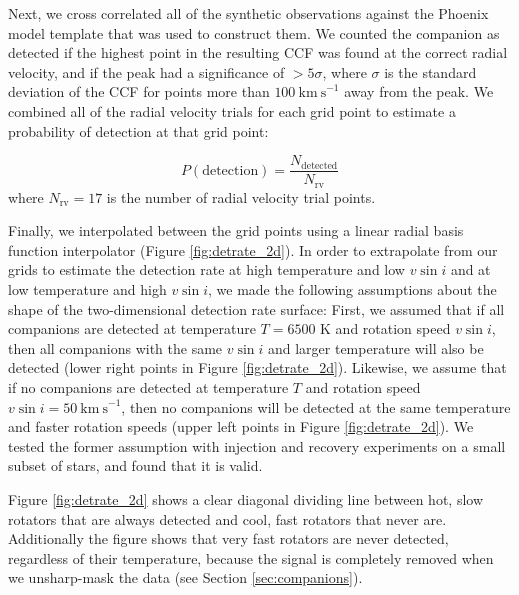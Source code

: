 \documentclass{emulateapj}
\begin{document}
Next, we cross correlated all of the synthetic observations against the Phoenix model template that was used to construct them. We counted the companion as detected if the highest point in the resulting CCF was found at the correct radial velocity, and if the peak had a significance of $>5\sigma$, where $\sigma$ is the standard deviation of the CCF for points more than $100\ \mathrm{km\ s}^{-1}$ away from the peak. We combined all of the radial velocity trials for each grid point to estimate a probability of detection at that grid point:

\begin{equation}
P(\mathrm{detection}) = \frac{N_\mathrm{detected}}{N_\mathrm{rv}}
\end{equation}
where $N_\mathrm{rv} = 17$ is the number of radial velocity trial points. 

Finally, we interpolated between the grid points using a linear radial basis function interpolator (Figure \ref{fig:detrate_2d}). In order to extrapolate from our grids to estimate the detection rate at high temperature and low $v\sin{i}$ and at low temperature and high $v\sin{i}$, we made the following assumptions about the shape of the two-dimensional detection rate surface: First, we assumed that if all companions are detected at temperature $T=6500$ K and rotation speed $v\sin{i}$, then all companions with the same $v\sin{i}$ and larger temperature will also be detected (lower right points in Figure \ref{fig:detrate_2d}). Likewise, we assume that if no companions are detected at temperature $T$ and rotation speed $v\sin{i} = 50\ \mathrm{km\ s}^{-1}$, then no companions will be detected at the same temperature and faster rotation speeds (upper left points in Figure \ref{fig:detrate_2d}). We tested the former assumption with injection and recovery experiments on a small subset of stars, and found that it is valid.

Figure \ref{fig:detrate_2d} shows a clear diagonal dividing line between hot, slow rotators that are always detected and cool, fast rotators that never are. Additionally the figure shows that very fast rotators are never detected, regardless of their temperature, because the signal is completely removed when we unsharp-mask the data (see Section \ref{sec:companions}).
\end{document}
